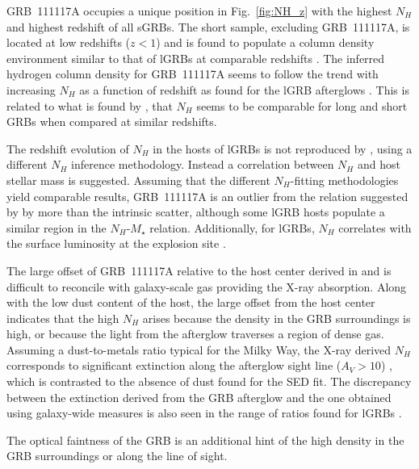 \documentclass{aa}    %
\begin{document}
GRB~111117A occupies a unique position in Fig.~\ref{fig:NH_z} with the highest
$N_H$ and highest redshift of all sGRBs. The short sample, excluding
GRB~111117A, is located at low redshifts ($z < 1$) and is found to populate a
column density environment similar to that of lGRBs at comparable redshifts
\citep{DAvanzo2014a}. The inferred hydrogen column density for GRB~111117A seems
to follow the trend with increasing $N_H$ as a function of redshift as found for
the lGRB afterglows \citep{Campana2010, Starling2013, Arcodia2016}. This is
related to what is found by \citet{Kopac2012, Margutti2013}, that $N_H$ seems to
be comparable for long and short GRBs when compared at similar redshifts.

The redshift evolution of $N_H$ in the hosts of lGRBs is not reproduced by
\citet{Buchner2017}, using a different $N_H$ inference methodology. Instead a
correlation between $N_H$ and host stellar mass is suggested. Assuming that the
different $N_H$-fitting methodologies yield comparable results, GRB~111117A is
an outlier from the relation suggested by \citet{Buchner2017} by more than the
intrinsic scatter, although some lGRB hosts populate a similar region in the
$N_H$-$M_\star$ relation. Additionally, for lGRBs, $N_H$ correlates with the
surface luminosity at the explosion site \citep{Lyman2017}. 

The large offset of GRB~111117A relative to the host center derived in
\citet{Margutti2012} and \citet{Sakamoto2013} is difficult to reconcile with
galaxy-scale gas providing the X-ray absorption. Along with the low dust content
of the host, the large offset from the host center indicates that the high $N_H$
arises because the density in the GRB surroundings is high, or because the light
from the afterglow traverses a region of dense gas. Assuming a dust-to-metals
ratio typical for the Milky Way, the X-ray derived $N_H$ corresponds to significant
extinction along the afterglow sight line ($A_V > 10$) \citep{Predehl1995},
which is contrasted to the absence of dust found for the SED fit. The discrepancy between the extinction derived from the GRB afterglow and the one obtained using galaxy-wide measures is also seen in the range of ratios found for lGRBs \citep{Perley2013a, Covino2013}.

The optical faintness of the
GRB is an additional hint of the high density in the GRB surroundings or along
the line of sight. 
\end{document}
